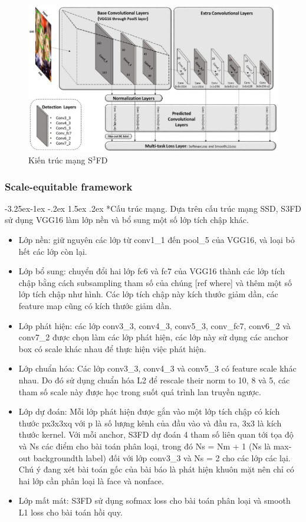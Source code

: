 \documentclass[a4paper]{report}
\makeatletter
\newcounter {subsubsubsection}[subsubsection]
\newcommand\subsubsubsection{\@startsection{subsubsubsection}{4}{\z@}%
                                     {-3.25ex\@plus -1ex \@minus -.2ex}%
                                     {1.5ex \@plus .2ex}%
                                     {\normalfont\normalsize\bfseries}}
\makeatother
\begin{document}
\begin{figure}[h!]
	\centering
	\includegraphics[width=1\textwidth]{3_s3fd_arch.png}
	\caption[Caption for LOF]{Kiến trúc mạng S$^3$FD \cite{s3sd}}
\end{figure}

\subsubsection{Scale-equitable framework}
\subsubsubsection*{Cấu trúc mạng.}
Dựa trên cấu trúc mạng SSD, S3FD sử dụng VGG16 làm lớp nền và bổ sung một số lớp tích chập khác. 

\begin{itemize}
\item Lớp nền:  giữ nguyên các lớp từ conv1\_1 đến pool\_5 của VGG16, và loại bỏ hết các lớp còn lại.
\item Lớp bổ sung: chuyển đổi hai lớp fc6 và fc7 của VGG16 thành các lớp tích chập bằng cách subsampling tham số của chúng [ref where] và thêm một số lớp tích chập như hình. Các lớp tích chập này kích thước giảm dần, các feature map cũng có kích thước giảm dần.
\item Lớp phát hiện: các lớp conv3\_3, conv4\_3, conv5\_3, conv\_fc7, conv6\_2 và conv7\_2 được chọn làm các lớp phát hiện, các lớp này sử dụng các anchor box có scale khác nhau để thực hiện việc phát hiện.
\item Lớp chuẩn hóa: Các lớp conv3\_3, conv4\_3 và conv5\_3 có feature scale khác nhau. Do đó sử dụng chuẩn hóa L2 để rescale their norm to 10, 8 và 5, các tham số scale này được học trong suốt quá trình lan truyền ngược.
\item Lớp dự đoán: Mỗi lớp phát hiện được gắn vào một lớp tích chập có kích thước px3x3xq với p là số lượng kênh của đầu vào và đầu ra, 3x3 là kích thước kernel. Với mỗi anchor, S3FD dự đoán 4 tham số liên quan tới tọa độ và Ns các điểm cho bài toán phân loại, trong đó Ns = Nm + 1 (Ns là max-out backgroundth label) đối với lớp conv3\_3 và Ns = 2 cho các lớp các lại. Chú ý đang xét bài toán gốc của bài báo là phát hiện khuôn mặt nên chỉ có hai lớp cần phân loại là face và nonface.
\item Lớp mất mát: S3FD sử dụng sofmax loss cho bài toán phân loại và smooth L1 loss cho bài toán hồi quy.
\end{itemize}
\end{document}
